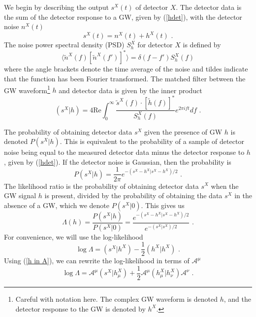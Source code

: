 \documentclass[11pt]{cuthesis}
\newcommand{\fs}{\text{ .}}
\begin{document}
We begin by describing the output $s^X(t)$ of detector $X$. The detector data is the sum of the detector response to a GW, given by (\ref{hdet}), with the detector noise $n^X(t)$
\begin{equation}
s^X(t) = n^X(t) + h^X(t) \fs
\end{equation}
The noise power spectral density (PSD) $S^X_h$ for detector $X$ is defined by
\begin{equation} \label{pygrb psd}
\langle \tilde{n}^X(f) [\tilde{n}^X(f')]^* \rangle = \delta (f-f') S^X_h(f)
\end{equation} 
where the angle brackets denote the time average of the noise and tildes indicate that the function has been Fourier transformed. The matched filter between the GW waveform\footnote{Careful with notation here. The complex GW waveform is denoted $h$, and the detector response to the GW is denoted by $h^X$.} $h$ and detector data is given by the inner product 
\begin{equation}
(s^X|h) = 4 \text{Re} \int^\infty_0 \frac{\tilde{s}^X(f) \cdot [\tilde{h}(f)]^*}{S^X_h (f)} e^{2\pi i ft}df \fs
\end{equation}

The probability of obtaining detector data $s^X$ given the presence of GW $h$ is denoted $P(s^X|h)$. This is equivalent to the probability of a sample of detector noise being equal to the measured detector data minus the detector response to $h$, given by (\ref{hdet}). If the detector noise is Gaussian, then the probability is
\begin{equation} \label{prob eqn}
P(s^X|h) = \frac{1}{2\pi}  e^{-(s^X-h^X|s^X-h^X)/2} \fs
\end{equation}
The likelihood ratio is the probability of obtaining detector data $s^X$ when the GW signal $h$ is present, divided by the probability of obtaining the data $s^X$ in the absence of a GW, which we denote $P(s^X|0)$. This gives us
\begin{equation}
\Lambda (h) = \frac{P(s^X|h)}{P(s^X|0)} = \frac{e^{-(s^X-h^X|s^X-h^X)/2}}{e^{-(s^X|s^X)/2}} \fs
\end{equation}
For convenience, we will use the log-likelihood 
\begin{equation}
\log \Lambda = (s^X|h^X) - \frac{1}{2}(h^X|h^X) \fs
\end{equation}
Using (\ref{h in A}), we can rewrite the log-likelihood in terms of $\mathcal{A}^\mu$
\begin{equation}
\log \Lambda = \mathcal{A}^\mu(s^X|h^X_\mu) + \frac{1}{2} \mathcal{A}^\mu (h^X_\mu | h^X_\nu) \mathcal{A}^\nu \fs
\end{equation}
\end{document}
